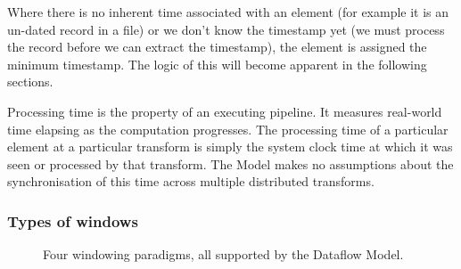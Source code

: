 Where there is no inherent time associated with an element (for example it is an un-dated record in a file) or we don't know the timestamp yet (we must process the record before we can extract the timestamp), the element is assigned the minimum timestamp.
The logic of this will become apparent in the following sections.

Processing time is the property of an executing pipeline.
It measures real-world time elapsing as the computation progresses.
The processing time of a particular element at a particular transform is simply the system clock time at which it was seen or processed by that transform.
The Model makes no assumptions about the synchronisation of this time across multiple distributed transforms.

\subsubsection{Types of windows}

\begin{figure}[t]
	\caption{Four windowing paradigms, all supported by the Dataflow Model.}
	\label{fig:prep:window-types}
\end{figure}

